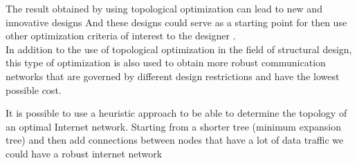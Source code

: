 \documentclass[10pt]{article}
\begin{document}
The result obtained by using topological optimization can lead to new and innovative designs%
And these designs could serve as a starting point for then use other optimization criteria of interest to the designer \cite{bendsoe2003topology}. \\

In addition to the use of topological optimization in the field of structural design, this type of optimization is also used to obtain more robust communication networks that are governed by different design restrictions and have the lowest possible cost.

It is possible to use a heuristic approach to be able to determine the topology of an optimal Internet network. Starting from a shorter tree (minimum expansion tree) and then add connections between nodes that have a lot of data traffic we could have a robust internet network
\end{document}
